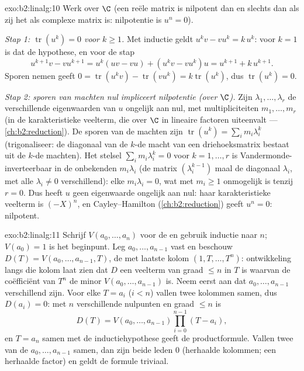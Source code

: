 \begin{solution}{exo:b2:linalg:10}
Werk over $\C$ (een reële matrix is nilpotent dan en slechts dan
als zij het als complexe matrix is: nilpotentie is $u^n = 0$).

\emph{Stap 1: $\operatorname{tr}(u^k) = 0$ voor $k \geq 1$.} Met
inductie geldt $u^k v - v u^k = k\, u^k$: voor $k = 1$ is dat de
hypothese, en voor de stap
\[
u^{k+1}v - vu^{k+1} = u^k(uv - vu) + (u^k v - v u^k)u
= u^{k+1} + k\,u^{k+1} .
\]
Sporen nemen geeft $0 = \operatorname{tr}(u^k v) -
\operatorname{tr}(vu^k) = k \operatorname{tr}(u^k)$, dus
$\operatorname{tr}(u^k) = 0$.

\emph{Stap 2: sporen van machten nul impliceert nilpotentie (over
$\C$).} Zijn $\lambda_1, \dots, \lambda_r$ de verschillende
eigenwaarden van $u$ ongelijk aan nul, met multipliciteiten $m_1,
\dots, m_r$ (in de karakteristieke veelterm, die over $\C$ in
lineaire factoren uiteenvalt --- \cref{ch:b2:reduction}). De sporen
van de machten zijn $\operatorname{tr}(u^k) = \sum_i m_i
\lambda_i^k$ (trigonaliseer: de diagonaal van de $k$-de macht van
een driehoeksmatrix bestaat uit de $k$-de machten). Het stelsel
$\sum_i m_i \lambda_i^k = 0$ voor $k = 1, \dots, r$ is
Vandermonde-inverteerbaar in de onbekenden $m_i\lambda_i$ (de
matrix $(\lambda_i^{k-1})$ maal de diagonaal $\lambda_i$, met alle
$\lambda_i \neq 0$ verschillend): elke $m_i \lambda_i = 0$, wat
met $m_i \geq 1$ onmogelijk is tenzij $r = 0$. Dus heeft $u$ geen
eigenwaarde ongelijk aan nul: haar karakteristieke veelterm is
$(-X)^n$, en Cayley--Hamilton (\cref{ch:b2:reduction}) geeft $u^n
= 0$: nilpotent.
\end{solution}

\begin{solution}{exo:b2:linalg:11}
Schrijf $V(a_0, \dots, a_n)$ voor de  en gebruik
inductie naar $n$; $V(a_0) = 1$ is het beginpunt. Leg $a_0, \dots,
a_{n-1}$ vast en beschouw $D(T) = V(a_0, \dots, a_{n-1}, T)$, de
 met laatste kolom $(1, T, \dots, T^n)$: ontwikkeling
langs die kolom laat zien dat $D$ een veelterm van graad $\leq n$
in $T$ is waarvan de coëfficiënt van $T^n$ de minor $V(a_0, \dots,
a_{n-1})$ is. Neem eerst aan dat $a_0, \dots, a_{n-1}$
verschillend zijn. Voor elke $T = a_i$ ($i < n$) vallen twee
kolommen samen, dus $D(a_i) = 0$: met $n$ verschillende nulpunten
en graad $\leq n$ is
\[
D(T) = V(a_0, \dots, a_{n-1}) \prod_{i=0}^{n-1}(T - a_i),
\]
en $T = a_n$ samen met de inductiehypothese geeft de
productformule. Vallen twee van de $a_0, \dots, a_{n-1}$ samen,
dan zijn beide leden $0$ (herhaalde kolommen; een herhaalde
factor) en geldt de formule triviaal.
\end{solution}

